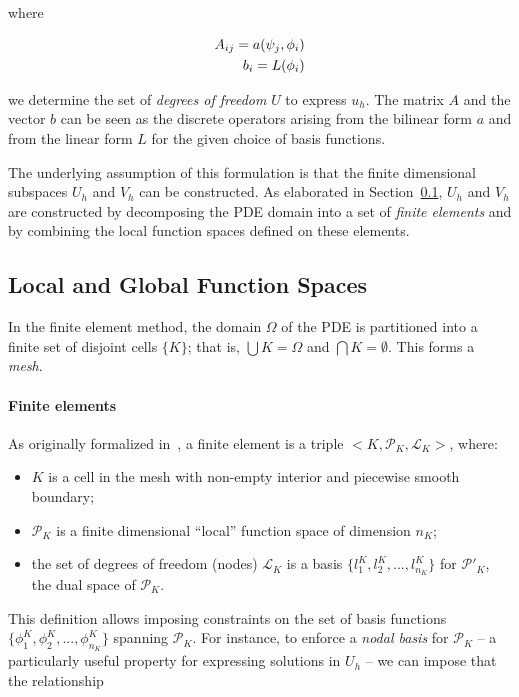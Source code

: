 where

\begin{equation}
\label{sec:bkg:eq:disc-op}
\centering
\begin{split}
A_{ij} = a(\psi_j,\phi_i) \\
b_i = L(\phi_i)
\end{split}
\end{equation}

we determine the set of {\em degrees of freedom} $U$ to express $u_h$. The matrix $A$ and the vector $b$ can be seen as the discrete operators arising from the bilinear form $a$ and from the linear form $L$ for the given choice of basis functions.

The underlying assumption of this formulation is that the finite dimensional subspaces $U_h$ and $V_h$ can be constructed. As elaborated in Section~\ref{sec:bkg:finite-elements}, $U_h$ and $V_h$ are constructed by decomposing the PDE domain into a set of {\em finite elements} and by combining the local function spaces defined on these elements. 



\subsection{Local and Global Function Spaces}
\label{sec:bkg:finite-elements}
In the finite element method, the domain $\Omega$ of the PDE is partitioned into a finite set of disjoint cells $\lbrace K \rbrace$; that is, $\bigcup K = \Omega$ and $\bigcap K = \emptyset$. This forms a {\em mesh}. 

\paragraph{Finite elements}
As originally formalized in~\cite{ciarlet-fem}, a finite element is a triple ${<}K,\mathcal{P}_K,\mathcal{L}_K{>}$, where:
\begin{itemize}
\item $K$ is a cell in the mesh with non-empty interior and piecewise smooth boundary;
\item $\mathcal{P}_K$ is a finite dimensional ``local'' function space of dimension $n_K$;
\item the set of degrees of freedom (nodes) $\mathcal{L}_K$ is a basis $\lbrace l_1^K, l_2^K, ..., l_{n_K}^K\rbrace$ for $\mathcal{P}'_K$, the dual space of $\mathcal{P}_K$. 
\end{itemize}
This definition allows imposing constraints on the set of basis functions $\lbrace \phi_1^K, \phi_2^K, ..., \phi_{n_K}^K\rbrace$ spanning $\mathcal{P}_K$. For instance, to enforce a {\em nodal basis} for $\mathcal{P}_K$ -- a particularly useful property for expressing solutions in $U_h$ -- we can impose that the relationship

